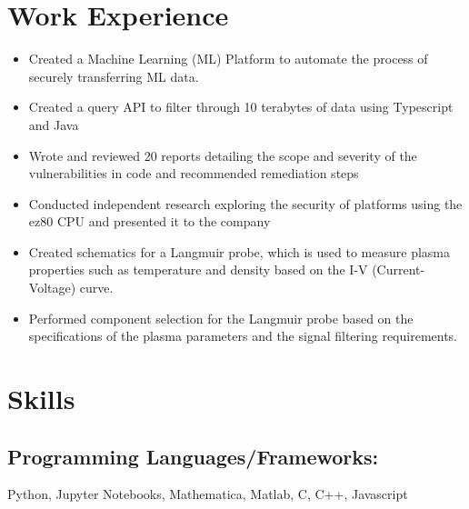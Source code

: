 \documentclass[letterpaper,11pt]{article}
\begin{document}
\section{Work Experience}
\begin{itemize}
    \item Created a Machine Learning (ML) Platform to automate the process of securely transferring ML data.
    \item Created a query API to filter through 10 terabytes of data using Typescript and Java
\end{itemize}

\begin{itemize}
    \item Wrote and reviewed 20 reports detailing the scope and severity of the vulnerabilities in code and recommended remediation steps 
    \item Conducted independent research exploring the security of platforms using the ez80 CPU and presented it to the company
\end{itemize}


\begin{itemize}
    \item Created schematics for a Langmuir probe, which is used to measure plasma properties such as temperature and density based on the I-V (Current-Voltage) curve.
 \item Performed component selection for the Langmuir probe based on the specifications of the plasma parameters and the signal filtering requirements.
\end{itemize}
\pagebreak

\section{Skills}
\subsection{Programming Languages/Frameworks:}
Python, Jupyter Notebooks, Mathematica, Matlab, C, C++, Javascript
\end{document}

